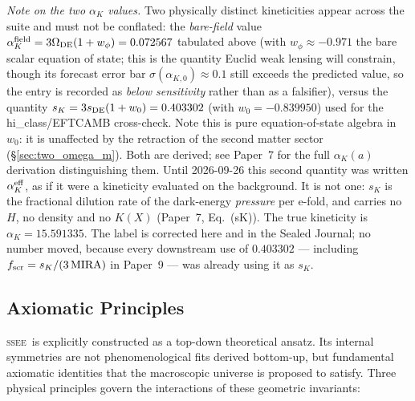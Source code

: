 \documentclass[12pt,a4paper]{article}
\newcommand{\SSEE}{\ifmmode\mathrm{SSEE}\else\textsc{ssee}\fi}
\begin{document}
\noindent\emph{Note on the two $\alpha_K$ values.} Two physically distinct
kineticities appear across the suite and must not be conflated: the
\emph{bare-field} value $\alpha_K^{\rm field}=3\Omega_{\rm DE}(1+w_\phi)=0.072567$ tabulated above
(with $w_\phi\approx-0.971$ the bare scalar equation of state; this is the quantity
Euclid weak lensing will constrain, though its forecast error bar
$\sigma(\alpha_{K,0})\!\approx\!0.1$ still exceeds the predicted value, so the entry is
recorded as \emph{below sensitivity} rather than as a falsifier), versus the quantity
$s_K=3s_{\rm DE}(1+w_0)=0.403302$ (with $w_0=-0.839950$) used for the
hi\_class/EFTCAMB cross-check. Note this is pure equation-of-state algebra in
$w_0$: it is unaffected by the retraction of the second matter sector
(\S\ref{sec:two_omega_m}). Both are derived; see
Paper~7 for the full $\alpha_K(a)$ derivation distinguishing them.
Until 2026-09-26 this second quantity was written $\alpha_K^{\rm eff}$, as if it
were a kineticity evaluated on the background. It is not one: $s_K$ is the
fractional dilution rate of the dark-energy \emph{pressure} per e-fold, and
carries no $H$, no density and no $K(X)$ (Paper~7, Eq.~(sK)). The true
kineticity is $\alpha_K=15.591335$. The label is corrected here and in the
Sealed Journal; no number moved, because every downstream use of $0.403302$ ---
including $f_{\rm scr}=s_K/(3\,\mathrm{MIRA})$ in Paper~9 --- was already using
it as $s_K$.

\subsection{Axiomatic Principles}
\label{sec:axioms}

\SSEE\ is explicitly constructed as a top-down theoretical ansatz. Its internal symmetries
are not phenomenological fits derived bottom-up, but fundamental axiomatic identities that
the macroscopic universe is proposed to satisfy. Three physical principles govern the interactions of
these geometric invariants:
\end{document}
